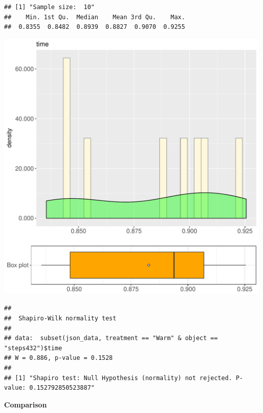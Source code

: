 \documentclass{article}\usepackage[]{graphicx}\usepackage[]{color}
\makeatletter
\def\maxwidth{ %
  \ifdim\Gin@nat@width>\linewidth
    \linewidth
  \else
    \Gin@nat@width
  \fi
}
\newenvironment{kframe}{%
 \def\at@end@of@kframe{}%
 \ifinner\ifhmode%
  \def\at@end@of@kframe{\end{minipage}}%
  \begin{minipage}{\columnwidth}%
 \fi\fi%
 \def\FrameCommand##1{\hskip\@totalleftmargin \hskip-\fboxsep
 \colorbox{shadecolor}{##1}\hskip-\fboxsep
     \hskip-\linewidth \hskip-\@totalleftmargin \hskip\columnwidth}%
 \MakeFramed {\advance\hsize-\width
   \@totalleftmargin\z@ \linewidth\hsize
   \@setminipage}}%
 {\par\unskip\endMakeFramed%
 \at@end@of@kframe}
\newenvironment{knitrout}{}{} %
\makeatother
\begin{document}
\begin{knitrout}
\color{fgcolor}\begin{kframe}
\begin{verbatim}
## [1] "Sample size:  10"
##    Min. 1st Qu.  Median    Mean 3rd Qu.    Max. 
##  0.8355  0.8482  0.8939  0.8827  0.9070  0.9255
\end{verbatim}
\end{kframe}
\includegraphics[width=\maxwidth]{figure/RH1_Warm_steps432-1} 
\begin{kframe}\begin{verbatim}
## 
## 	Shapiro-Wilk normality test
## 
## data:  subset(json_data, treatment == "Warm" & object == "steps432")$time
## W = 0.886, p-value = 0.1528
## 
## [1] "Shapiro test: Null Hypothesis (normality) not rejected. P-value: 0.152792850523887"
\end{verbatim}
\end{kframe}
\end{knitrout}
  
 \textbf{Comparison}
  
\end{document}
